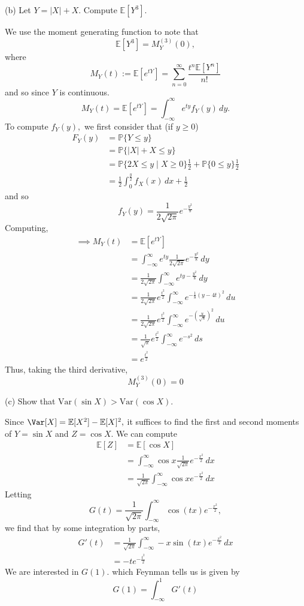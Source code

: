 \documentclass[11pt]{article}
\newcommand{\bbE}{\mathbb{E}}
\newcommand{\bbP}{\mathbb{P}}
\begin{document}
(b) Let \(Y = |X| + X\). Compute \(\mathbb{E}[Y^3]\).
\begin{solution}
    We use the moment generating function to note that 
    \[\bbE[Y^3] = M_Y^{(3)}(0),\] where 
    \[M_Y(t) := \bbE[e^{tY}] = \sum_{n=0}^\infty \frac{t^n \bbE[Y^n]}{n!}\] and so since $Y$ is continuous.
    \[M_Y(t) = \bbE[e^{tY}] = \int_{-\infty}^\infty e^{ty}f_Y(y)\,dy.\] To compute $f_Y(y),$ we first consider that (if $y \geq 0$) 
    \begin{align*}
        F_Y(y) &= \bbP\{Y \leq y\}\\
        &= \bbP\{|X| + X \leq y\}\\
        &= \bbP\{2X \leq y \mid X\geq 0\}\frac{1}{2} + \bbP\{0 \leq y\}\frac{1}{2}\\
        &= \frac{1}{2}\int_0^{\frac{y}{2}} f_X(x)\,dx + \frac{1}{2}
    \end{align*}
    and so \[f_Y(y)= \frac{1}{2\sqrt{2\pi}}e^{-\frac{y^2}{8}}\] Computing, 
    \begin{align*}
        \implies M_Y(t) &= \bbE[e^{tY}]\\ &= \int_{-\infty}^\infty e^{ty}\frac{1}{2\sqrt{2\pi}}e^{-\frac{y^2}{8}}\,dy\\
        &= \frac{1}{2\sqrt{2\pi}}\int_{-\infty}^\infty e^{ty - \frac{y^2}{8}}\,dy\\
        &= \frac{1}{2\sqrt{2\pi}}e^{\frac{t^2}{2}}\int_{-\infty}^\infty e^{-\frac{1}{8}(y- 4t)^2}\,du\\
        &= \frac{1}{2\sqrt{2\pi}}e^{\frac{t^2}{2}}\int_{-\infty}^\infty e^{-\left(\frac{u}{\sqrt{8}}\right)^2}\,du\\
        &= \frac{1}{\sqrt{\pi}}e^{\frac{t^2}{2}}\int_{-\infty}^\infty e^{-s^2}\,ds\\
        &= e^{\frac{t^2}{2}}
    \end{align*}
    Thus, taking the third derivative, 
    \[M_Y^{(3)}(0) = 0\]
\end{solution}

(c) Show that \(\text{Var}(\sin X) > \text{Var}(\cos X)\).
\begin{solution}
Since $\Var[X] = \bbE[X^2] - \bbE[X]^2,$ it suffices to find the first and second moments of $Y =\sin X$ and $Z = \cos X.$ We can compute
\begin{align*}
    \bbE[Z] &= \bbE[\cos X]\\
    &= \int_{-\infty}^\infty \cos x \frac{1}{\sqrt{2\pi}}e^{-\frac{x^2}{2}}\,dx\\
    &= \frac{1}{\sqrt{2\pi}}\int_{-\infty}^\infty \cos x e^{-\frac{x^2}{2}}\,dx
\end{align*}
Letting 
\[G(t) = \frac{1}{\sqrt{2\pi}}\int_{-\infty}^\infty \cos (tx) e^{-\frac{x^2}{2}},\] we find that by  some integration by parts,
\begin{align*}
  G'(t) &= \frac{1}{\sqrt{2\pi}}\int_{-\infty}^\infty -x\sin(tx) e^{-\frac{x^2}{2}} \,dx\\
  &= -te^{-\frac{t^2}{2}}
\end{align*}
We are interested in $G(1).$ which Feynman tells us is given by 
\[G(1) = \int_{-\infty}^1 G'(t)\]
\end{solution}
\end{document}
